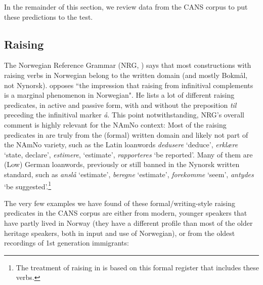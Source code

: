 \documentclass[output=paper,colorlinks,citecolor=brown]{langscibook}
\begin{document}
In the remainder of this section, we review data from the CANS corpus to put these predictions to the test. 

\subsection{Raising} \label{raising}

The Norwegian Reference Grammar (NRG, \citealt[1027]{faaretal97}) says that most constructions with raising verbs in Norwegian belong to the written domain (and mostly Bokmål, not Nynorsk). \citet[2]{lodrup2002} opposes ``the impression that raising from infinitival complements is a marginal phenomenon in Norwegian". He lists a lot of different raising predicates, in active and passive form, with and without the preposition \textit{til} preceding the infinitival marker \textit{\aa}. This point notwithstanding, NRG's overall comment is highly relevant for the NAmNo context: Most of the raising predicates in \citet{lodrup2002} are truly from the (formal) written domain and likely not part of the NAmNo variety, such as the Latin loanwords \textit{dedusere} `deduce', \textit{erklære} `state, declare', \textit{estimere}, `estimate', \textit{rapporteres} `be reported'. Many of them are (Low) German loanwords, previously or still banned in the Nynorsk written standard, such as \textit{anslå} `estimate', \textit{beregne} `estimate', \textit{forekomme} `seem', \textit{antydes} `be suggested'.\footnote{The treatment of raising in \citet[Section 11.4]{aafarli2003} is based on this formal register that includes these verbs.}

The very few examples we have found of these formal/writing-style raising predicates in the CANS corpus are either from modern, younger speakers that have partly lived in Norway (they have a different profile than most of the older heritage speakers, both in input and use of Norwegian), or from the oldest recordings of 1st generation immigrants:
\end{document}
